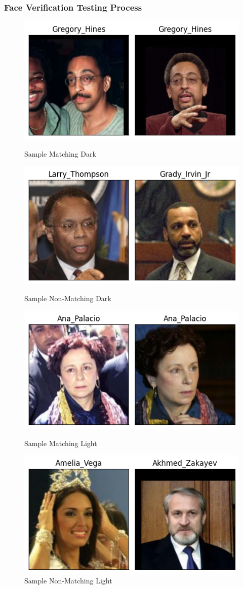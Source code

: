\documentclass[conference]{IEEEtran}
\begin{document}
\subsubsection{Face Verification Testing Process}

\begin{figure}[hbt!]
    \centering
    \includegraphics[height=0.3\linewidth]{latex/images/MatchingDark.png}
    \caption{Sample Matching Dark}
    \label{matching_dark}
    
    \centering
    \includegraphics[height=0.3\linewidth]{latex/images/NonMatchingDark.png}
    \caption{Sample Non-Matching Dark}
    \label{non_matching_dark}

    \centering
    \includegraphics[height=0.3\linewidth]{latex/images/MatchingLight.png}
    \caption{Sample Matching Light}
    \label{matching_dark}

    \centering
    \includegraphics[height=0.3\linewidth]{latex/images/NonMatchingLight.png}
    \caption{Sample Non-Matching Light}
    \label{non_matching_dark}
\end{figure}
\end{document}
